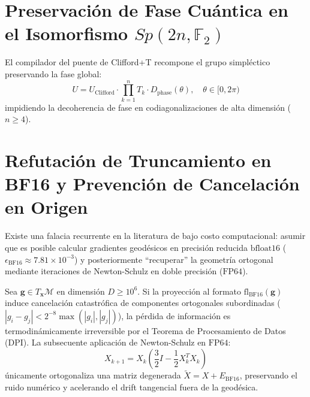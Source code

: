\section{Preservación de Fase Cuántica en el Isomorfismo $Sp(2n, \mathbb{F}_2)$}
El compilador del puente de Clifford+T recompone el grupo simpléctico preservando la fase global:
\begin{equation}
U = U_{\text{Clifford}} \cdot \prod_{k=1}^{n} T_k \cdot D_{\text{phase}}(\theta), \quad \theta \in [0, 2\pi)
\end{equation}
impidiendo la decoherencia de fase en codiagonalizaciones de alta dimensión ($n \ge 4$).

\section{Refutación de Truncamiento en BF16 y Prevención de Cancelación en Origen}
\label{sec:refutacion_bf16_newton_schulz}

Existe una falacia recurrente en la literatura de bajo costo computacional: asumir que es posible calcular gradientes geodésicos en precisión reducida $\text{bfloat16}$ ($\epsilon_{\text{BF16}} \approx 7.81 \times 10^{-3}$) y posteriormente ``recuperar'' la geometría ortogonal mediante iteraciones de Newton-Schulz en doble precisión ($\text{FP64}$).

\begin{theorem}
Sea $\mathbf{g} \in T_{\mathbf{x}}\mathcal{M}$ en dimensión $D \ge 10^6$. Si la proyección al formato $\text{fl}_{\text{BF16}}(\mathbf{g})$ induce cancelación catastrófica de componentes ortogonales subordinadas ($|g_i - g_j| < 2^{-8} \max(|g_i|, |g_j|)$), la pérdida de información es termodinámicamente irreversible por el Teorema de Procesamiento de Datos (DPI). La subsecuente aplicación de Newton-Schulz en $\text{FP64}$:
\begin{equation}
X_{k+1} = X_k \left( \frac{3}{2} I - \frac{1}{2} X_k^T X_k \right)
\end{equation}
únicamente ortogonaliza una matriz degenerada $\tilde{X} = X + E_{\text{BF16}}$, preservando el ruido numérico y acelerando el drift tangencial fuera de la geodésica.
\end{theorem}


